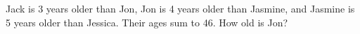 Jack is 3 years older than Jon, Jon is 4 years older than Jasmine, and Jasmine is 5 years older than Jessica. Their ages sum to 46. How old is Jon?
